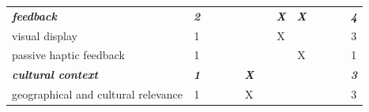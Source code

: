 \documentclass[letterpaper, 12pt]{article}
\begin{document}
\begin{spacing}{1.1}
\begin{supertabular}{L{5.3cm}cccccccccccc}
        \emph{\textbf{feedback}} & \emph{\textbf{2}} & & & & & & \emph{\textbf{X}} & \emph{\textbf{X}} &   &   &   & \emph{\textbf{4}}  \\
        visual display                   & 1  &   &   &   &   &   & X &   &   &   &   & 3  \\
        passive haptic feedback          & 1  &   &   &   &   &   &   & X &   &   &   & 1  \\
        \hline

        \emph{\textbf{cultural context}} & \emph{\textbf{1}} & & & & \emph{\textbf{X}} & & & & & & & \emph{\textbf{3}} \\
        geographical and cultural relevance  & 1  &   &   &   & X &   &   &   &   &   &   & 3  \\
        \hline
    \end{supertabular}
\end{spacing}
\end{document}
